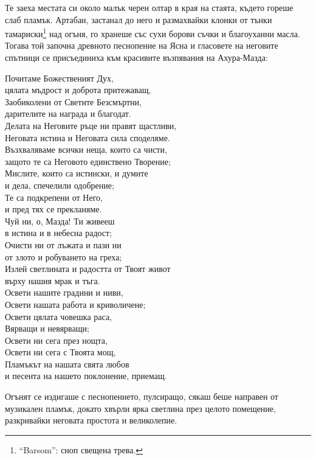 \documentclass[oneside,10pt]{memoir}
\begin{document}
Те заеха местата си около малък черен олтар в края на стаята, където гореше слаб
пламък. Артабан, застанал до него и размахвайки клонки от тънки
тамариски\footnote{``Barsom'': сноп свещена трева.} над огъня, го хранеше със
сухи борови съчки и благоуханни масла. Тогава той започна древното песнопение на
Ясна и гласовете на неговите спътници се присъединиха към красивите възпявания
на Ахура-Мазда:
\begin{center}
\fontsize{8}{10}\selectfont
\setlength{\leftskip}{1cm}
Почитаме Божественият Дух, \\
цялата мъдрост и доброта притежаващ, \\
Заобиколени от Светите Безсмъртни, \\
дарителите на награда и благодат. \\
Делата на Неговите ръце ни правят щастливи, \\
Неговата истина и Неговата сила споделяме. \\
Възхваляваме всички неща, които са чисти, \\
защото те са Неговото единствено Творение; \\
Мислите, които са истински, и думите \\
и дела, спечелили одобрение; \\
Те са подкрепени от Него, \\
и пред тях се прекланяме. \\
Чуй ни, о, Мазда! Ти живееш \\
в истина и в небесна радост; \\
Очисти ни от лъжата и пази ни \\
от злото и робуването на греха; \\
Излей светлината и радостта от Твоят живот \\
върху нашия мрак и тъга. \\
Освети нашите градини и ниви, \\
Освети нашата работа и криволичене; \\
Освети цялата човешка раса, \\
Вярващи и невярващи; \\
Освети ни сега през нощта, \\
Освети ни сега с Твоята мощ, \\
Пламъкът на нашата свята любов \\
и песента на нашето поклонение, приемащ.
\end{center}

Огънят се издигаше с песнопението, пулсиращо, сякаш беше направен от музикален
пламък, докато хвърли ярка светлина през целото помещение, разкривайки неговата
простота и великолепие.
\end{document}
